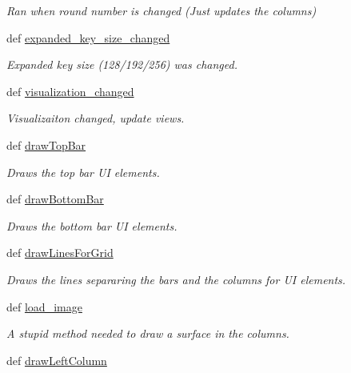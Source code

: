 \begin{DoxyCompactItemize}
\begin{DoxyCompactList}\small\item\em Ran when round number is changed (Just updates the columns) \end{DoxyCompactList}\item 
def \hyperlink{classsimplegui_1_1_main_scene_aeb4a9163209211e2da60c5956d0f0028}{expanded\-\_\-key\-\_\-size\-\_\-changed}
\begin{DoxyCompactList}\small\item\em Expanded key size (128/192/256) was changed. \end{DoxyCompactList}\item 
def \hyperlink{classsimplegui_1_1_main_scene_aa53b6cd3c1c56ced6a8fe4b98602314e}{visualization\-\_\-changed}
\begin{DoxyCompactList}\small\item\em Visualizaiton changed, update views. \end{DoxyCompactList}\item 
def \hyperlink{classsimplegui_1_1_main_scene_a46b737949a8af3c0637f63e3223c655d}{draw\-Top\-Bar}
\begin{DoxyCompactList}\small\item\em Draws the top bar U\-I elements. \end{DoxyCompactList}\item 
def \hyperlink{classsimplegui_1_1_main_scene_ab5ce2a41f55ec406f4902fb0ce2a5845}{draw\-Bottom\-Bar}
\begin{DoxyCompactList}\small\item\em Draws the bottom bar U\-I elements. \end{DoxyCompactList}\item 
def \hyperlink{classsimplegui_1_1_main_scene_ab5ba5b0e3ab5ac61668929effb1a5544}{draw\-Lines\-For\-Grid}
\begin{DoxyCompactList}\small\item\em Draws the lines separaring the bars and the columns for U\-I elements. \end{DoxyCompactList}\item 
def \hyperlink{classsimplegui_1_1_main_scene_a3a8096d9c941aacdee8e159858f67866}{load\-\_\-image}
\begin{DoxyCompactList}\small\item\em A stupid method needed to draw a surface in the columns. \end{DoxyCompactList}\item 
def \hyperlink{classsimplegui_1_1_main_scene_a74c3de5ad8f9cbf50fd626e539ec29d1}{draw\-Left\-Column}

\end{DoxyCompactItemize}
